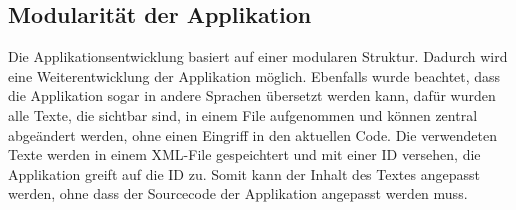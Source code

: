 \clearpage
\subsection{Modularität der Applikation}

Die Applikationsentwicklung basiert auf einer modularen Struktur.  Dadurch wird eine Weiterentwicklung der Applikation möglich. Ebenfalls wurde beachtet, dass die Applikation sogar in andere Sprachen übersetzt werden kann, dafür wurden alle Texte, die sichtbar sind, in einem File aufgenommen und können zentral abgeändert werden, ohne einen Eingriff in den aktuellen Code. Die verwendeten Texte werden in einem XML-File gespeichtert und mit einer ID versehen, die Applikation greift auf die ID zu. Somit kann der Inhalt des Textes angepasst werden, ohne dass der Sourcecode der Applikation angepasst werden muss.






